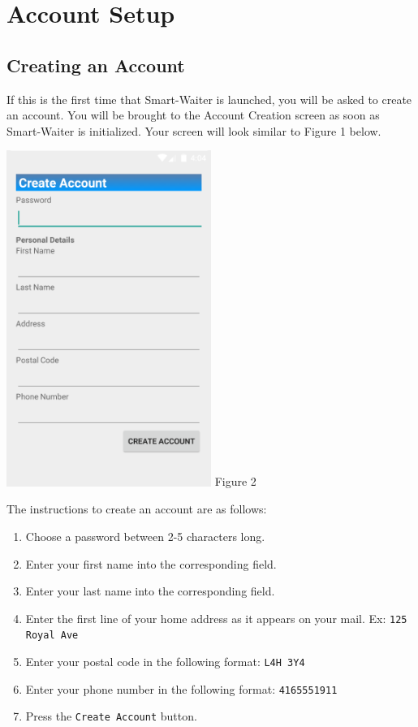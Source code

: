\documentclass[12pt, titlepage]{article}
\begin{document}
\section{Account Setup}
\subsection{Creating an Account}
If this is the first time that Smart-Waiter is launched, you will be asked to create an account. You will be brought to the Account Creation screen as soon as Smart-Waiter is initialized. Your screen will look similar to Figure 1 
below. 

\begin{center}
\includegraphics[width=0.5\textwidth]{accountCreation.PNG} 
\linebreak Figure 2 
\end{center}

The instructions to create an account are as follows: 
\begin{enumerate}
	\item Choose a password between 2-5 characters long.
	\item Enter your first name into the corresponding field.
	\item Enter your last name into the corresponding field.
	\item Enter the first line of your home address as it appears on your mail. Ex: \texttt{125 Royal Ave}
	\item Enter your postal code in the following format: \texttt{L4H 3Y4}
	\item Enter your phone number in the following format: \texttt{4165551911}
	\item Press the \texttt{Create Account} button.
\end{enumerate}
\end{document}
